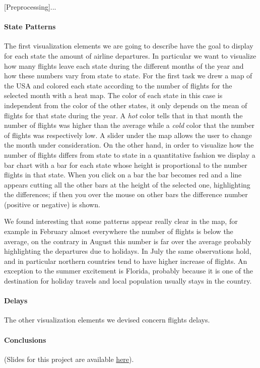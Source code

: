 \documentclass[a4paper, 12pt]{article}
\begin{document}
[Preprocessing]...

\paragraph*{State Patterns}
The first visualization elements we are going to describe have the goal to display for each state the 
amount of airline departures. In particular we want to visualize how many flights leave each state during
the different months of the year and how these numbers vary from state to state. For the first task we
drew a map of the USA and colored each state according to the number of flights for the selected month
with a heat map. The color of each state in this case is independent from the color of the other states,
it only depends on the mean of flights for that state during the year. A \emph{hot} color tells that in
that month the number of flights was higher than the average while a \emph{cold} color that the number of
flights was respectively low. A slider under the map allows the user to change the month under
consideration. On the other hand, in order to visualize how the number of flights differs from state to 
state in a quantitative fashion we display a bar chart with a bar for each state whose height is
proportional to the number flights in that state. When you click on a bar the bar becomes red and a line
appears cutting all the other bars at the height of the selected one, highlighting the differences; if 
then you over the mouse on other bars the difference number (positive or negative) is shown.


We found interesting that some patterns appear really clear in the map, for example in February almost
everywhere the number of flights is below the average, on the contrary in August this number is far over
the average probably highlighting the departures due to holidays. In July the same observations hold, and 
in particular northern countries tend to have higher increase of flights. An exception to the summer 
excitement is Florida, probably because it is one of the destination for holiday travels and local
population usually stays in the country.


\paragraph*{Delays}
The other visualization elements we devised concern flights delays.


\paragraph*{Conclusions}
(Slides for this project are available \href{https://docs.google.com/presentation/d/1T_p1oarqUuNt5APTaf7IwTJEzUDJC0CoNfJKHdak0so/edit?usp=sharing}{here}).
\end{document}
